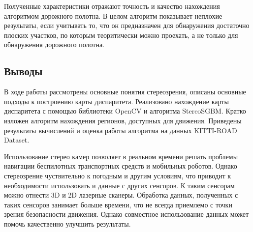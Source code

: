\documentclass[oneside,final,12pt]{scrartcl}
\begin{document}
			Полученные характеристики отражают точность и качество нахождения алгоритмом дорожного полотна. В целом алгоритм показывает неплохие результаты, если учитывать то, что он предназначен для обнаружения достаточно плоских участков, по которым теоритически можно проехать, а не только для обнаружения дорожного полотна.

		\subsection{Выводы}
			В ходе работы рассмотрены основные понятия стереозрения, описаны основные подходы к построению карты диспаритета. Реализовано нахождение карты диспаритета с помощью библиотеки OpenCV и алгоритма StereoSGBM. Кратко изложен алгоритм нахождения регионов, доступных для движения. Приведены результаты вычислений и оценка работы алгоритма на данных KITTI-ROAD Dataset.

			Использование стерео камер позволяет в реальном времени решать проблемы навигации беспилотных транспортных средств и мобильных роботов. Однако стереозрение чуствительно к погодным и другим условиям, что приводит к необходимости использовать и данные с других сенсоров. К таким сенсорам можно отнести 3D и 2D лазерные сканеры. Обработка данных, полученных с таких сенсоров занимает больше времени, что не всегда приемлемо с точки зрения безопасности движения. Однако совместное использование данных может помочь качественно улучшить результаты.
\end{document}

